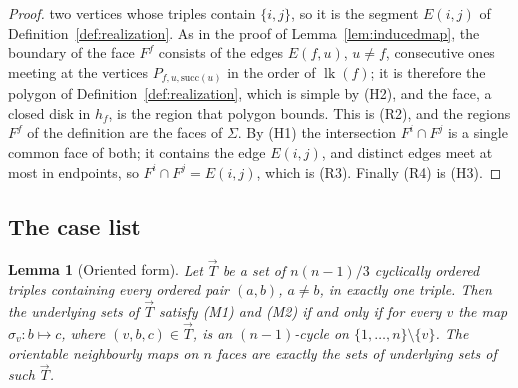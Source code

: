 \documentclass[11pt,reqno]{amsart}
\theoremstyle{plain}
\newtheorem{lemma}[theorem]{Lemma}
\theoremstyle{definition}
\newcommand{\link}{\operatorname{lk}}
\begin{document}
\begin{proof}
two vertices whose triples contain $\{i,j\}$, so it is the segment $E(i,j)$ of
Definition~\ref{def:realization}. As in the proof of Lemma~\ref{lem:inducedmap}, the boundary of the
face $F^f$ consists of the edges $E(f,u)$, $u\ne f$, consecutive ones meeting at the vertices
$P_{f,u,\mathrm{succ}(u)}$ in the order of $\link(f)$; it is therefore the polygon of
Definition~\ref{def:realization}, which is simple by (H2), and the face, a closed disk in $h_f$, is the
region that polygon bounds. This is (R2), and the regions $F^f$ of the definition are the faces of
$\Sigma$. By (H1) the intersection $F^i\cap F^j$ is a single common face of both; it contains the edge
$E(i,j)$, and distinct edges meet at most in endpoints, so $F^i\cap F^j=E(i,j)$, which is (R3).
Finally (R4) is (H3).
\end{proof}

\subsection{The case list}

\begin{lemma}[Oriented form]\label{lem:oriented}
Let $\vec T$ be a set of $n(n-1)/3$ cyclically ordered triples containing every ordered pair $(a,b)$,
$a\ne b$, in exactly one triple. Then the underlying sets of $\vec T$ satisfy \textup{(M1)} and
\textup{(M2)} if and only if for every $v$ the map $\sigma_v\colon b\mapsto c$, where
$(v,b,c)\in\vec T$, is an $(n-1)$-cycle on $\{1,\dots,n\}\setminus\{v\}$. The orientable
neighbourly maps on $n$ faces are exactly the sets of underlying sets of such $\vec T$.
\end{lemma}
\end{document}
